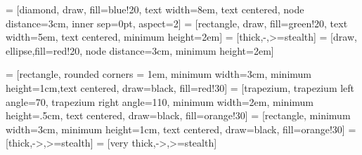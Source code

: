  = [diamond, draw, fill=blue!20,
    text width=8em, text centered, node distance=3cm, inner sep=0pt,   aspect=2]
 = [rectangle, draw, fill=green!20,
    text width=5em, text centered,  minimum height=2em]
 = [thick,-,>=stealth]
 = [draw, ellipse,fill=red!20, node distance=3cm,
    minimum height=2em]

     = [rectangle, rounded corners = 1em, minimum width=3cm, minimum height=1cm,text centered, draw=black, fill=red!30]
     = [trapezium, trapezium left angle=70, trapezium right angle=110, minimum width=2em, minimum height=.5cm, text centered, draw=black, fill=orange!30]
     = [rectangle, minimum width=3cm, minimum height=1cm, text centered, draw=black, fill=orange!30]
 = [thick,->,>=stealth]
 = [very thick,->,>=stealth]
